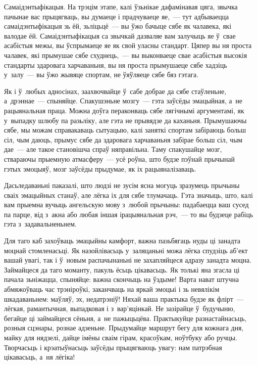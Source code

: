 Самаідэнтыфікацыя. На трэцім этапе, калі ўзьнікае дафамінавая цяга, звычка пачынае вас прыцягваць, вы думаеце і прадчуваеце яе,~--- тут адбываецца самаідэнтыфікацыя зь ёй, зьліцьцё~--- вы ўжо бачыце сябе як чалавека, які валодае ёй. Самаідэнтыфікацыя са звычкай дазваляе вам залучыць яе ў~свае асабістыя межы, вы ўспрымаеце яе як свой уласны стандарт. Цяпер вы ня проста чалавек, які прымушае сябе схуднець,~--- вы выконваеце свае асабістыя высокія стандарты здаровага харчаваньня, вы ня проста прымушаеце сябе хадзіць у~залу~--- вы ўжо жывяце спортам, не ўяўляеце сябе бяз гэтага.

Як і ў~любых адносінах, заахвочвайце ў~сабе добрае да сябе стаўленьне, а~дрэннае~--- спыняйце. Спакушэньне мозгу~--- гэта заўсёды эмацыйная, а~не рацыянальная праца. Можна доўга пераконваць сябе лягічнымі аргументамі, як у~выпадку шлюбу па разьліку, але гэта не прывядзе да каханьня. Прымушаючы сябе, мы можам справакаваць сытуацыю, калі заняткі спортам забіраюць больш сіл, чым даюць, прымус сябе да здаровага харчаваньня забірае больш сіл, чым дае~--- але такое становішча спраў няправільна. Таму спакушайце мозг, ствараючы прыемную атмасферу~--- усё роўна, што будзе пэўнай прычынай гэтых эмоцыяў, мозг заўсёды прыдумае, як іх рацыяналізаваць.

Дасьледаваньні паказалі, што людзі не зусім ясна могуць зразумець прычыны сваіх эмацыйных станаў, але лёгка іх для сябе тлумачаць. Гэта значыць, што, калі вам прыемна вучыць ангельскую мову з~любой прычыны: падабаецца ваш сусед па парце, від з~акна або любая іншая ірацыянальная рэч,~--- то вы будзеце рабіць гэта з~задавальненьнем.

Для таго каб захоўваць эмацыйны камфорт, важна пазьбягаць нуды ці занадта моцнай стомленасьці. Як назойлівасьць у~заляцаньні можа лёгка спудзіць аб'ект вашай увагі, так і ў~новым распачынаньні не захапляйцеся адразу занадта моцна. Займайцеся да таго моманту, пакуль ёсьць цікавасьць. Як толькі яна згасла ці пачала зьніжацца, спыняйце: важна скончыць на ўздыме! Варта нават штучна абмяжоўваць час трэніроўкі, заканчваць на яркай эмоцыі і зь невялікім шкадаваньнем: маўляў, эх, недатрэніў! Няхай ваша практыка будзе як флірт~--- лёгкая, рамантычная, выпадковая і з~вар'яцінкай. Не зазірайце ў~будучыню, бегайце ці займайцеся сёньня, а~не пажыцьцёва. Практыкуйце разнастайнасьць, розныя сцэнары, рознае адзеньне. Прыдумайце маршрут бегу для кожнага дня, майку для нядзелі, дайце імёны сваім гірам, красоўкам, ноўтбуку або ручцы. Творчасьць і крэатыўнасьць заўсёды прыцягваюць увагу: нам патрэбная цікавасьць, а~ня лёгіка!

